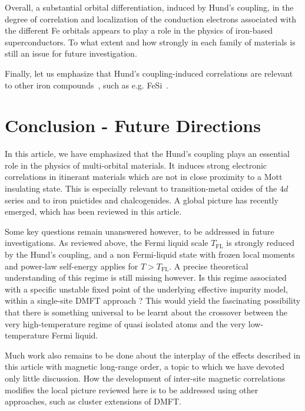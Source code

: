 \documentclass[]{ar2e-changed}%
\def\TFL{T_{\mathrm{FL}}}
\begin{document}
Overall, a substantial orbital differentiation, induced by Hund's coupling, in the degree of correlation and localization of the conduction electrons 
associated with the different Fe orbitals appears to play a role in the physics of iron-based superconductors. 
To what extent and how strongly in each family of materials is still an issue for future investigation.

Finally, let us emphasize that Hund's coupling-induced correlations are relevant 
to other iron compounds~\cite{vanacker_moments_ironmaterials_prb_1988}, 
such as e.g. FeSi~\cite{arita_FeSi_prb_2008,tomczak_FeSi_PNAS_2012}.

\section{Conclusion - Future Directions}

In this article, we have emphasized that the Hund's coupling plays an essential role in the physics of 
multi-orbital materials. It induces strong electronic correlations in itinerant materials which are not 
in close proximity to a Mott insulating state. This is especially relevant to transition-metal oxides 
of the $4d$ series and to iron pnictides and chalcogenides. A global picture has recently emerged, 
which has been reviewed in this article. 

%
Some key questions remain unanswered however, to be addressed in future investigations. 
As reviewed above, the Fermi liquid scale $\TFL$ is strongly reduced by the Hund's coupling, and 
a non Fermi-liquid state with frozen local moments and power-law self-energy applies for 
$T>\TFL$. A precise theoretical understanding of this regime is still missing however. 
Is this regime associated with a specific unstable fixed point 
of the underlying effective impurity model, within a single-site DMFT approach ?  
This would yield the fascinating possibility that there is 
something universal to be learnt about the crossover between the very high-temperature regime 
of  quasi isolated atoms and the very low-temperature Fermi liquid.

Much work also remains to be done about the interplay of the effects described in this article 
with magnetic long-range order, a topic to which we have devoted only little discussion. 
How the development of inter-site magnetic correlations modifies the local picture reviewed here 
is to be addressed using other approaches, such as cluster extensions of DMFT. 
\end{document}

